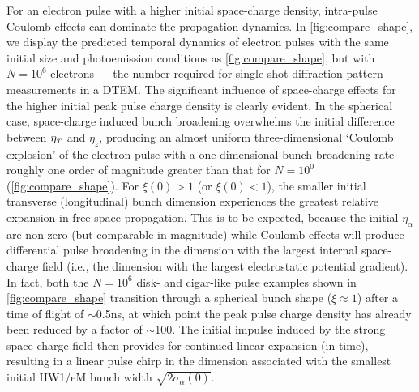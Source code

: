For an electron pulse with a higher initial space-charge density, intra-pulse Coulomb effects can dominate the propagation dynamics.
In \ref{fig:compare_shape}, we display the predicted temporal dynamics of electron pulses with the same initial size and photoemission conditions as \ref{fig:compare_shape}, but with $ N = 10^{6} $ electrons --- the number required for single-shot diffraction pattern measurements in a DTEM.\cite{berger_dc_2009,armstrong_practical_2007}
The significant influence of space-charge effects for the higher initial peak pulse charge density is clearly evident.
In the spherical case, space-charge induced bunch broadening overwhelms the initial difference between $\eta_{{\scriptscriptstyle T}}$ and $\eta_{z}$, producing an almost uniform three-dimensional `Coulomb explosion' of the electron pulse with a one-dimensional bunch broadening rate roughly one order of magnitude greater than that for $ N = 10^{0} $ (\ref{fig:compare_shape}).
For $ \xi (0) > 1 $ (or $ \xi (0) < 1 $), the smaller initial transverse (longitudinal) bunch dimension experiences the greatest relative expansion in free-space propagation. This is to be expected, because the initial $\eta_{\alpha}$ are non-zero (but comparable in magnitude) while Coulomb effects will produce differential pulse broadening in the dimension with the largest internal space-charge field (i.e., the dimension with the largest electrostatic potential gradient).
In fact, both the $ N = 10^{6} $ disk- and cigar-like pulse examples shown in \ref{fig:compare_shape} transition through a spherical bunch shape ($ \xi \approx 1 $) after a time of flight of $\sim$0.5ns, at which point the peak pulse charge density has already been reduced by a factor of $\sim$100.
The initial impulse induced by the strong space-charge field then provides for continued linear expansion (in time), resulting in a linear pulse chirp in the dimension associated with the smallest initial HW1/eM bunch width\cite{michalik_analytic_2006,berger_dc_2009} $ \sqrt{ 2 \sigma_{\alpha} (0) } $.

